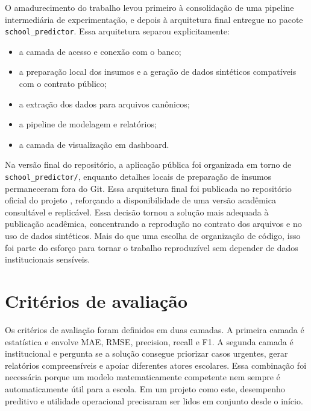 O amadurecimento do trabalho levou primeiro \`a consolida\c{c}\~ao de uma pipeline intermedi\'aria de experimenta\c{c}\~ao, e depois \`a arquitetura final entregue no pacote \texttt{school\_predictor}. Essa arquitetura separou explicitamente:
\begin{itemize}
    \item a camada de acesso e conex\~ao com o banco;
    \item a prepara\c{c}\~ao local dos insumos e a gera\c{c}\~ao de dados sintéticos compat\'iveis com o contrato p\'ublico;
    \item a extra\c{c}\~ao dos dados para arquivos can\^onicos;
    \item a pipeline de modelagem e relat\'orios;
    \item a camada de visualiza\c{c}\~ao em dashboard.
\end{itemize}

Na vers\~ao final do reposit\'orio, a aplica\c{c}\~ao p\'ublica foi organizada em torno de \texttt{school\_predictor/}, enquanto detalhes locais de prepara\c{c}\~ao de insumos permaneceram fora do Git. Essa arquitetura final foi publicada no reposit\'orio oficial do projeto \cite{schoolpredictorgithub}, refor\c{c}ando a disponibilidade de uma vers\~ao acad\^emica consult\'avel e replic\'avel. Essa decis\~ao tornou a solu\c{c}\~ao mais adequada \`a publica\c{c}\~ao acad\^emica, concentrando a reprodu\c{c}\~ao no contrato dos arquivos e no uso de dados sintéticos. Mais do que uma escolha de organiza\c{c}\~ao de c\'odigo, isso foi parte do esfor\c{c}o para tornar o trabalho reproduz\'ivel sem depender de dados institucionais sens\'iveis.

\section{Crit\'erios de avalia\c{c}\~ao}
\label{sec:criterios-avaliacao}

Os crit\'erios de avalia\c{c}\~ao foram definidos em duas camadas. A primeira camada \'e estat\'istica e envolve MAE, RMSE, precision, recall e F1. A segunda camada \'e institucional e pergunta se a solu\c{c}\~ao consegue priorizar casos urgentes, gerar relat\'orios compreens\'iveis e apoiar diferentes atores escolares. Essa combina\c{c}\~ao foi necess\'aria porque um modelo matematicamente competente nem sempre \'e automaticamente \'util para a escola. Em um projeto como este, desempenho preditivo e utilidade operacional precisaram ser lidos em conjunto desde o in\'icio.

